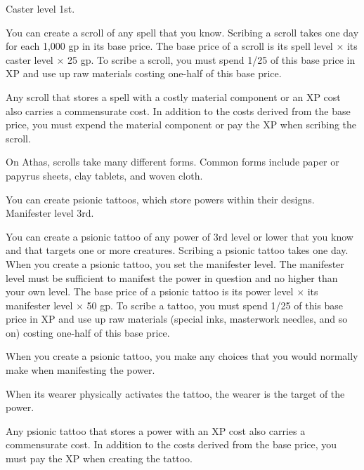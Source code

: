 {}
{Caster level 1st.}
{You can create a scroll of any spell that you know. Scribing a scroll takes one day for each 1,000 gp in its base price. The base price of a scroll is its spell level $\times$ its caster level $\times$ 25 gp. To scribe a scroll, you must spend 1/25 of this base price in XP and use up raw materials costing one-half of this base price.

Any scroll that stores a spell with a costly material component or an XP cost also carries a commensurate cost. In addition to the costs derived from the base price, you must expend the material component or pay the XP when scribing the scroll.}
{}
{On Athas, scrolls take many different forms. Common forms include paper or papyrus sheets, clay tablets, and woven cloth.}

{You can create psionic tattoos, which store powers within their designs.}
{Manifester level 3rd.}
{You can create a psionic tattoo of any power of 3rd level or lower that you know and that targets one or more creatures. Scribing a psionic tattoo takes one day. When you create a psionic tattoo, you set the manifester level. The manifester level must be sufficient to manifest the power in question and no higher than your own level. The base price of a psionic tattoo is its power level $\times$ its manifester level $\times$ 50 gp. To scribe a tattoo, you must spend 1/25 of this base price in XP and use up raw materials (special inks, masterwork needles, and so on) costing one-half of this base price.

When you create a psionic tattoo, you make any choices that you would normally make when manifesting the power.

When its wearer physically activates the tattoo, the wearer is the target of the power.

Any psionic tattoo that stores a power with an XP cost also carries a commensurate cost. In addition to the costs derived from the base price, you must pay the XP when creating the tattoo.}{}{}